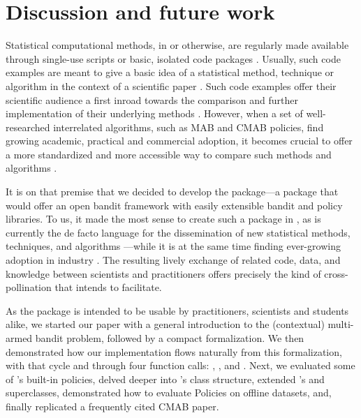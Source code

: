 \documentclass{jss}
\begin{document}
\section{Discussion and future work} \label{future}

Statistical computational methods, in  or otherwise, are regularly made available through single-use scripts or basic, isolated code packages \citep{Gandrud2016}. Usually, such code examples are meant to give a basic idea of a statistical method, technique or algorithm in the context of a scientific paper \citep{Stodden2013}. Such code examples offer their scientific audience a first inroad towards the comparison and further implementation of their underlying methods \citep{Buckheit1995}. However, when a set of well-researched interrelated algorithms, such as MAB and CMAB policies, find growing academic, practical and commercial adoption, it becomes crucial to offer a more standardized and more accessible way to compare such methods and algorithms \citep{Mesirov2010}.

It is on that premise that we decided to develop the   package---a package that would offer an open bandit framework with easily extensible bandit and policy libraries. To us, it made the most sense to create such a package in  \citep{RCore}, as  is currently the de facto language for the dissemination of new statistical methods, techniques, and algorithms \citep{Tippmann2015}---while it is at the same time finding ever-growing adoption in industry \citep{2012}. The resulting lively exchange of  related code, data, and knowledge between scientists and practitioners offers precisely the kind of cross-pollination that  intends to facilitate.

As the package is intended to be usable by practitioners, scientists and students alike, we started our paper with a general introduction to the (contextual) multi-armed bandit problem, followed by a compact formalization. We then demonstrated how our implementation flows naturally from this formalization, with  that cycle  and  through four function calls: , ,  and . Next, we evaluated some of 's built-in policies, delved deeper into 's class structure, extended 's  and  superclasses, demonstrated how to evaluate Policies on offline datasets, and, finally replicated a frequently cited CMAB paper.
\end{document}
